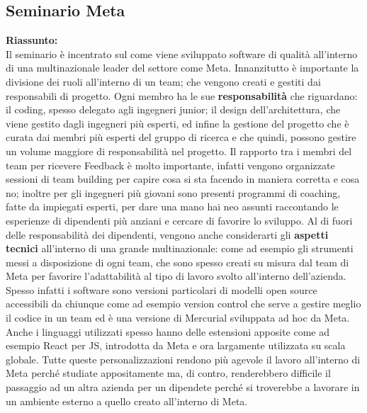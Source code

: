 \documentclass{article}
\begin{document}
\subsection{Seminario Meta}
\textbf{Riassunto:}\\
Il seminario è incentrato sul come viene sviluppato software di qualità all'interno di una multinazionale leader del settore come Meta.
Innanzitutto è importante la divisione dei ruoli all'interno di un team; che vengono creati e gestiti dai responsabili di progetto.
Ogni membro ha  le sue \textbf{responsabilità} che riguardano: il coding, spesso delegato agli ingegneri junior; il design dell'architettura, che viene gestito dagli ingegneri più esperti, ed infine la gestione del progetto che è curata dai membri più esperti del gruppo di ricerca e che quindi, possono gestire un volume maggiore di responsabilità nel progetto.
Il rapporto tra i membri del team per ricevere Feedback è molto importante, infatti vengono organizzate sessioni di team building per capire cosa si sta facendo in maniera corretta e cosa no; inoltre per gli ingegneri più giovani sono presenti programmi di coaching, fatte da impiegati esperti, per dare una mano hai neo assunti raccontando le esperienze di dipendenti più anziani e cercare di favorire lo sviluppo.
Al di fuori delle responsabilità dei dipendenti, vengono anche considerarti gli \textbf{aspetti tecnici} all'interno di una grande multinazionale: come ad esempio gli strumenti messi a disposizione di ogni team, che sono spesso creati su misura dal team di Meta per favorire l'adattabilità al tipo di lavoro svolto all'interno dell'azienda. Spesso infatti i software sono versioni particolari di modelli open source accessibili da chiunque come ad esempio version control che serve a gestire meglio il codice in un team ed è una versione di Mercurial sviluppata ad hoc da Meta.
Anche i linguaggi utilizzati spesso hanno delle estensioni apposite come ad esempio React per JS, introdotta da Meta e ora largamente utilizzata su scala globale.
Tutte queste personalizzazioni rendono più agevole il lavoro all'interno di Meta perché studiate appositamente ma, di contro, renderebbero difficile il passaggio ad un altra azienda per un dipendete perché si troverebbe a lavorare in un ambiente esterno a quello creato all'interno di Meta.
\end{document}
